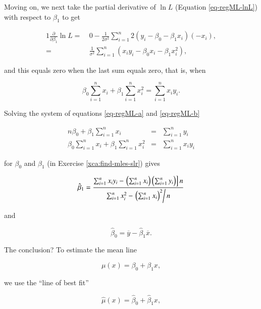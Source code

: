 \documentclass[]{book}
\numberwithin{equation}{chapter}
\numberwithin{figure}{chapter}
\theoremstyle{plain}
\theoremstyle{definition}
\theoremstyle{remark}
\theoremstyle{definition}
\theoremstyle{definition}
\theoremstyle{remark}
\begin{document}
Moving on, we next take the partial derivative of \(\ln L\) (Equation
\eqref{eq-regML-lnL}) with respect to \(\beta_{1}\) to get

\begin{alignat}{1}
\frac{\partial}{\partial \beta_{1}} \ln L = \ & 0 - \frac{1}{2\sigma^{2}} \sum_{i=1}^{n} 2 (y_{i} - \beta_{0} - \beta_{1} x_{i})(-x_{i}),\\ = & \frac{1}{\sigma^{2}}\sum_{i = 1}^{n}\left(x_{i} y_{i} - \beta_{0}x_{i} - \beta_{1}x_{i}^{2}\right),
\end{alignat}

and this equals zero when the last sum equals zero, that is, when

\begin{equation}
\label{eq-regML-b}
\beta_{0} \sum_{i = 1}^{n}x_{i} + \beta_{1} \sum_{i = 1}^{n}x_{i}^{2} = \sum_{i = 1}^{n}x_{i}y_{i}.
\end{equation}

Solving the system of equations \eqref{eq-regML-a} and
\eqref{eq-regML-b}

\begin{eqnarray}
n\beta_{0} + \beta_{1}\sum_{i = 1}^{n}x_{i} & = & \sum_{i = 1}^{n}y_{i}\\
\beta_{0}\sum_{i = 1}^{n}x_{i}+\beta_{1}\sum_{i = 1}^{n}x_{i}^{2} & = & \sum_{i = 1}^{n}x_{i}y_{i}
\end{eqnarray}

for \(\beta_{0}\) and \(\beta_{1}\) (in Exercise
\ref{xca:find-mles-slr}) gives

\begin{equation}
\label{eq-regline-slope-formula}
\hat{\beta}_{1} = \frac{\sum_{i = 1}^{n}x_{i}y_{i} - \left.\left(\sum_{i = 1}^{n}x_{i}\right)\left(\sum_{i = 1}^{n}y_{i}\right)\right] n}{\sum_{i = 1}^{n}x_{i}^{2} - \left.\left(\sum_{i = 1}^{n}x_{i}\right)^{2}\right/ n}
\end{equation}

and

\begin{equation}
\hat{\beta}_{0} = \overline{y} - \hat{\beta}_{1}\overline{x}.
\end{equation}

The conclusion? To estimate the mean line

\begin{equation}
\mu(x) = \beta_{0} + \beta_{1}x,
\end{equation}

we use the ``line of best fit''

\begin{equation}
\hat{\mu}(x) = \hat{\beta}_{0} + \hat{\beta}_{1}x,
\end{equation}
\end{document}

